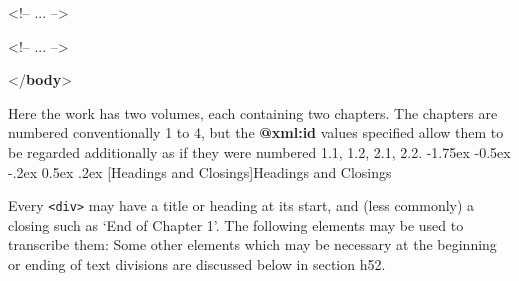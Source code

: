 \documentclass[11pt,twoside]{article}\makeatletter
\makeatletter
\renewcommand\section{\@startsection {section}{1}{\z@}%
     {-1.75ex \@plus -0.5ex \@minus -.2ex}%
     {0.5ex \@plus .2ex}%
     {\reset@font\Large\bfseries\sffamily}}
\renewcommand\subsection{\@startsection{subsection}{2}{\z@}%
     {-1.75ex\@plus -0.5ex \@minus- .2ex}%
     {0.5ex \@plus .2ex}%
     {\reset@font\Large\sffamily}}
\def\DivII{\subsection}
\def\DivII{\section}
\makeatother
\begin{document}
\begin{shaded}
\hspace*{6pt}\mbox{}\newline 
\begin{it}<!-- ... -->\end{it}\mbox{}\newline 
\hspace*{6pt}\mbox{}\newline 
\hspace*{6pt}\mbox{}\newline 
\begin{it}<!-- ... -->\end{it}\mbox{}\newline 
\hspace*{6pt}\mbox{}\newline 
{}\mbox{}\newline 
{</\textbf{body}>}\end{shaded}\egroup\par \noindent  Here the work has two volumes, each containing two chapters. The chapters are numbered conventionally 1 to 4, but the \textbf{@xml:id} values specified allow them to be regarded additionally as if they were numbered 1.1, 1.2, 2.1, 2.2.
\DivII[Headings and Closings]{Headings and Closings}\label{h25}\par
Every \texttt{<div>}  may have a title or heading at its start, and (less commonly) a closing such as ‘End of Chapter 1’.  The following elements may be used to transcribe them:    Some other elements which may be necessary at the beginning or ending of text divisions are discussed below in section h52.\par
\end{document}
